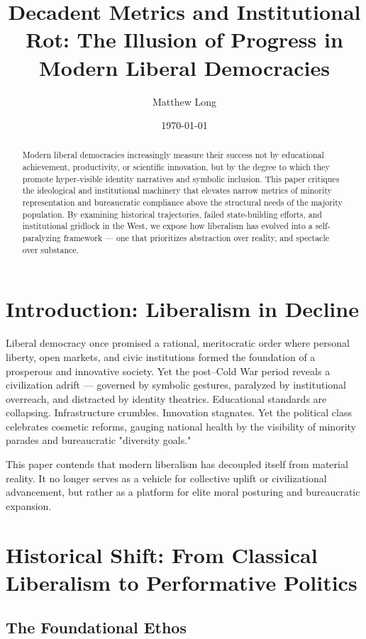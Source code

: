\documentclass[11pt]{article}
\title{\textbf{Decadent Metrics and Institutional Rot: The Illusion of Progress in Modern Liberal Democracies}}
\author[1]{Matthew Long}
\affil[1]{Yoneda AI Research}
\date{\today}
\begin{document}
\maketitle

\begin{abstract}
Modern liberal democracies increasingly measure their success not by educational achievement, productivity, or scientific innovation, but by the degree to which they promote hyper-visible identity narratives and symbolic inclusion. This paper critiques the ideological and institutional machinery that elevates narrow metrics of minority representation and bureaucratic compliance above the structural needs of the majority population. By examining historical trajectories, failed state-building efforts, and institutional gridlock in the West, we expose how liberalism has evolved into a self-paralyzing framework — one that prioritizes abstraction over reality, and spectacle over substance.
\end{abstract}

\section{Introduction: Liberalism in Decline}

Liberal democracy once promised a rational, meritocratic order where personal liberty, open markets, and civic institutions formed the foundation of a prosperous and innovative society. Yet the post–Cold War period reveals a civilization adrift — governed by symbolic gestures, paralyzed by institutional overreach, and distracted by identity theatrics. Educational standards are collapsing. Infrastructure crumbles. Innovation stagnates. Yet the political class celebrates cosmetic reforms, gauging national health by the visibility of minority parades and bureaucratic "diversity goals."

This paper contends that modern liberalism has decoupled itself from material reality. It no longer serves as a vehicle for collective uplift or civilizational advancement, but rather as a platform for elite moral posturing and bureaucratic expansion.

\section{Historical Shift: From Classical Liberalism to Performative Politics}

\subsection{The Foundational Ethos}
\end{document}
